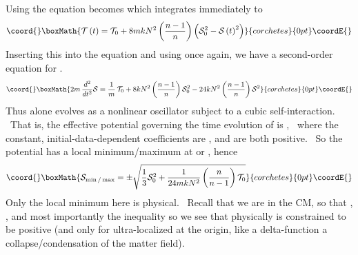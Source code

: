 \documentclass[a4paper,12pt]{article}%
\begin{document}
Using \coordHE{} the \coordHE{}
equation becomes \coordHE{} which integrates immediately to
\[\coord{}\boxMath{
\mathcal{T}\left(  t\right)  =\mathcal{T}_{0}+8mkN^{2}\left(  \frac{n-1}%
{n}\right)  \left(  \mathcal{S}_{0}^{2}-\mathcal{S}\left(  t\right)
^{2}\right)
}{corchetes}{0pt}\coordE{}\]
Inserting this into the \coordHE{} equation and using \coordHE{} once again, we have a second-order
equation for \coordHE{}.%
\[\coord{}\boxMath{
2m\,\frac{d^{2}}{dt^{2}}\mathcal{S}=\frac{1}{m}\,\mathcal{T}_{0}%
+8kN^{2}\left(  \frac{n-1}{n}\right)  \mathcal{S}_{0}^{2}-24kN^{2}\left(
\frac{n-1}{n}\right)  \mathcal{S}^{2}%
}{corchetes}{0pt}\coordE{}\]
Thus \coordHE{} alone evolves as a nonlinear oscillator subject to a cubic
self-interaction. \ That is, the effective potential governing the time
evolution of \coordHE{} is \coordHE{}, \ where the constant, initial-data-dependent
coefficients are \coordHE{}  \coordHE{}, and are both positive. \ So the potential has a local minimum/maximum at
\coordHE{} or \coordHE{},
hence
\[\coord{}\boxMath{
\mathcal{S}_{\min/\max}=\pm\sqrt{\frac{1}{3}\mathcal{S}_{0}^{2}+\frac{1}%
{24mkN^{2}}\left(  \frac{n}{n-1}\right)  \mathcal{T}_{0}}%
}{corchetes}{0pt}\coordE{}\]
Only the local minimum here is physical. \ Recall that we are in the CM, so
that \coordHE{}, \coordHE{}, and most importantly the inequality
\coordHE{}so we see that physically \coordHE{} is
constrained to be positive (and \coordHE{} only for \coordHE{} ultra-localized at the origin, like a delta-function
\myHighlight{$\cdots$}\coordHE{} a collapse/condensation of the matter field).
\end{document}
